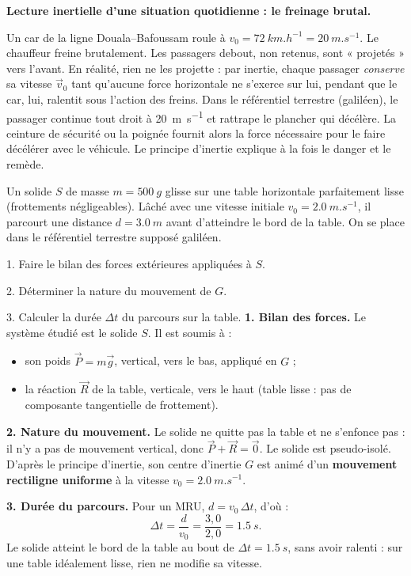 \documentclass[11pt]{article}
\newcommand{\cle}[1]{{\popxbold\color{popdark}#1}}
\newcounter{popsec}
\newcounter{popsub}
\newcommand{\courssub}[1]{%
  \stepcounter{popsub}%
  \par\vspace{9pt}\noindent{\popxbold\fontsize{11.5}{13}\selectfont\color{popink}{\color{poporange}\thepopsec.\thepopsub}\hspace{6pt}#1}\par\nopagebreak\vspace{4pt}
}
\begin{document}
\courssub{Applications du principe d'inertie}

\textbf{Lecture inertielle d'une situation quotidienne : le freinage brutal.}\par
Un car de la ligne Douala--Bafoussam roule à $v_0 = \SI{72}{km.h^{-1}} = \SI{20}{m.s^{-1}}$. Le chauffeur freine brutalement. Les passagers debout, non retenus, sont « projetés » vers l'avant. En réalité, rien ne les projette : par inertie, chaque passager \emph{conserve} sa vitesse $\vec{v}_0$ tant qu'aucune force horizontale ne s'exerce sur lui, pendant que le car, lui, ralentit sous l'action des freins. Dans le référentiel terrestre (galiléen), le passager continue tout droit à \SI{20}{m.s^{-1}} et rattrape le plancher qui décélère. La ceinture de sécurité ou la poignée fournit alors la force nécessaire pour le faire décélérer avec le véhicule. Le principe d'inertie explique à la fois le danger et le remède.

\begin{exoresolu}
Un solide $S$ de masse $m = \SI{500}{g}$ glisse sur une table horizontale parfaitement lisse (frottements négligeables). Lâché avec une vitesse initiale $v_0 = \SI{2,0}{m.s^{-1}}$, il parcourt une distance $d = \SI{3,0}{m}$ avant d'atteindre le bord de la table. On se place dans le référentiel terrestre supposé galiléen.\par
1. Faire le bilan des forces extérieures appliquées à $S$.\par
2. Déterminer la nature du mouvement de $G$.\par
3. Calculer la durée $\Delta t$ du parcours sur la table.
\tcblower
\textbf{1. Bilan des forces.} Le système étudié est le solide $S$. Il est soumis à :
\begin{itemize}
\item son poids $\vec{P} = m\vec{g}$, vertical, vers le bas, appliqué en $G$ ;
\item la réaction $\vec{R}$ de la table, verticale, vers le haut (table lisse : pas de composante tangentielle de frottement).
\end{itemize}
\textbf{2. Nature du mouvement.} Le solide ne quitte pas la table et ne s'enfonce pas : il n'y a pas de mouvement vertical, donc $\vec{P} + \vec{R} = \vec{0}$. Le solide est \cle{pseudo-isolé}. D'après le principe d'inertie, son centre d'inertie $G$ est animé d'un \textbf{mouvement rectiligne uniforme} à la vitesse $v_0 = \SI{2,0}{m.s^{-1}}$.\par
\textbf{3. Durée du parcours.} Pour un MRU, $d = v_0 \, \Delta t$, d'où :
\[
\Delta t = \frac{d}{v_0} = \frac{3{,}0}{2{,}0} = \SI{1,5}{s}.
\]
Le solide atteint le bord de la table au bout de $\Delta t = \SI{1,5}{s}$, sans avoir ralenti : sur une table idéalement lisse, rien ne modifie sa vitesse.
\end{exoresolu}
\end{document}
